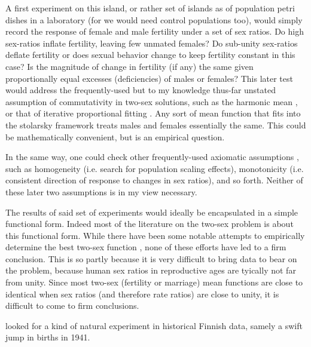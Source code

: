 A first experiment on this island, or rather set of islands as of population
petri dishes in a laboratory (for we would need control populations too), would
simply record the response of female and male fertility under a set of sex
ratios. Do high sex-ratios inflate fertility, leaving few unmated females? Do
sub-unity sex-ratios deflate fertility or does sexual behavior change to keep 
fertility constant in this case? Is the magnitude of change in fertility (if
any) the same given proportionally equal excesses (deficiencies) of males or
females? This later test would address the frequently-used but to my knowledge thus-far unstated
assumption of commutativity in two-sex solutions, such as the harmonic mean
\citep{schoen1981harmonic}, or that of iterative proportional fitting
\citep{mc1975models}. Any sort of mean function that
fits into the stolarsky framework treats males and females essentially the same. This could be
mathematically convenient, but is an empirical question.

In the same way, one could check other frequently-used axiomatic assumptions
\citep{mcfarland1972comparison}, such as homogeneity (i.e. search for
population scaling effects), monotonicity (i.e. consistent direction of
response to changes in sex ratios), and so forth. Neither of these later two
assumptions is in my view necessary.

The results of said set of experiments would ideally be encapsulated in a simple
functional form. Indeed most of the literature on the two-sex problem is about
this functional form. While there have been some notable attempts to empirically
determine the best two-sex function \citep{keyfitz1972mathematics,
alho2000competing}, none of these efforts have led to a firm conclusion. This is
so partly because it is very difficult to bring data to bear on the problem,
because human sex ratios in reproductive ages are tyically not far from unity. 
Since most two-sex (fertility or marriage) mean functions are close to
identical when sex ratios (and therefore rate ratios) are close to unity, it is
 difficult to come to firm conclusions. 
 
 \citet{alho2000competing} looked for a kind of natural experiment in historical
  Finnish data, samely a swift jump in births in 1941.


